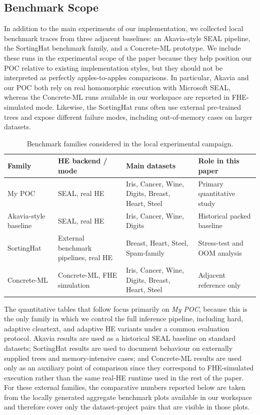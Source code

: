 \documentclass[runningheads]{llncs}
\begin{document}
\subsection{Benchmark Scope}

In addition to the main experiments of our implementation, we collected local
benchmark traces from three adjacent baselines: an Akavia-style SEAL
pipeline, the SortingHat benchmark family, and a Concrete-ML prototype.  We
include these runs in the experimental scope of the paper because they help
position our POC relative to existing implementation styles, but they should
not be interpreted as perfectly apples-to-apples comparisons.  In
particular, Akavia and our POC both rely on real homomorphic execution with
Microsoft SEAL, whereas the Concrete-ML runs available in our workspace are
reported in FHE-simulated mode.  Likewise, the SortingHat runs often use
external pre-trained trees and expose different failure modes, including
out-of-memory cases on larger datasets.

\begin{table}[t]
\centering
\caption{Benchmark families considered in the local experimental campaign.}
\label{tab:benchmark_families}
\footnotesize
\begin{tabular}{@{}p{2.2cm} p{2.8cm} p{4.0cm} p{3.0cm}@{}}
\toprule
Family & HE backend / mode & Main datasets & Role in this paper \\
\midrule
My POC & SEAL, real HE & Iris, Cancer, Wine, Digits, Breast, Heart, Steel & Primary quantitative study \\
Akavia-style baseline & SEAL, real HE & Iris, Cancer, Wine, Digits & Historical packed baseline \\
SortingHat & External benchmark pipelines, real HE & Breast, Heart, Steel, Spam-family & Stress-test and OOM analysis \\
Concrete-ML & Concrete-ML, FHE simulation & Iris, Cancer, Wine, Digits, Breast, Heart, Steel & Adjacent reference only \\
\bottomrule
\end{tabular}
\normalsize
\end{table}

The quantitative tables that follow focus primarily on \emph{My POC},
because this is the only family in which we control the full inference
pipeline, including hard, adaptive cleartext, and adaptive HE variants under
a common evaluation protocol.  Akavia results are used as a historical SEAL
baseline on standard datasets; SortingHat results are used to document
behaviour on externally supplied trees and memory-intensive cases; and
Concrete-ML results are used only as an auxiliary point of comparison since
they correspond to FHE-simulated execution rather than the same real-HE
runtime used in the rest of the paper.  For these external families, the
comparative numbers reported below are taken from the locally generated
aggregate benchmark plots available in our workspace and therefore cover
only the dataset-project pairs that are visible in those plots.
\end{document}
